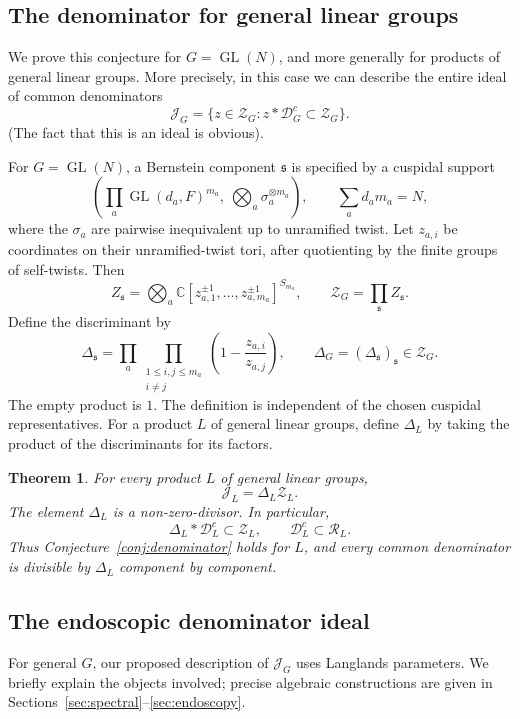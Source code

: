 \documentclass[11pt,a4paper]{amsart}
\newcommand{\mcD}{\mathcal D}
\newcommand{\mcZ}{\mathcal Z}
\newcommand{\mcR}{\mathcal R}
\newcommand{\mcJ}{\mathcal J}
\newtheorem{theorem}{Theorem}[section]
\theoremstyle{definition}
\theoremstyle{remark}
\DeclareMathOperator{\GL}{GL}
\newcommand{\grs}{\mathfrak s}
\begin{document}
\subsection{The denominator for general linear groups}
We prove this conjecture for $G=\GL(N)$, and more generally for
products of general linear groups. More precisely, in this case we
can describe the entire ideal of common denominators
$$
 \mcJ_G=\{z\in\mcZ_G:z*\mcD_G^c\subset\mcZ_G\}.
$$
(The fact that this is an ideal is obvious). 

For $G=\GL(N)$, a Bernstein component $\grs$ is specified by a
cuspidal support
$$
 \left(\prod_a\GL(d_a,F)^{m_a},\ 
             \bigotimes_a\sigma_a^{\otimes m_a}\right),
 \qquad \sum_a d_am_a=N,
$$
where the $\sigma_a$ are pairwise inequivalent up to unramified twist.
Let $z_{a,i}$ be coordinates on their unramified-twist tori, after
quotienting by the finite groups of self-twists. Then
$$
 Z_{\grs}=\bigotimes_a
    \mathbb C[z_{a,1}^{\pm1},\ldots,z_{a,m_a}^{\pm1}]^{S_{m_a}},
 \qquad \mcZ_G=\prod_{\grs}Z_{\grs}.
$$
Define the discriminant by
\begin{equation}\label{eq:intro-discriminant}
 \Delta_{\grs}
   =\prod_a\prod_{\substack{1\leq i,j\leq m_a\\i\ne j}}
            \left(1-\frac{z_{a,i}}{z_{a,j}}\right),
 \qquad \Delta_G=(\Delta_{\grs})_{\grs}\in\mcZ_G.
\end{equation}
The empty product is $1$. The definition is independent of the chosen
cuspidal representatives. For a product $L$ of general linear
groups, define $\Delta_L$ by taking the product of the discriminants
for its factors.

\begin{theorem}\label{T:denominator-exact}
For every product $L$ of general linear groups,
$$
 {\mcJ_L=\Delta_L\mcZ_L.}
$$
The element $\Delta_L$ is a non-zero-divisor. In particular,
$$
 \Delta_L*\mcD_L^c\subset\mcZ_L,
 \qquad \mcD_L^c\subset\mcR_L.
$$
Thus Conjecture~\ref{conj:denominator} holds for $L$, and every
common denominator is divisible by $\Delta_L$ component by component.
\end{theorem}

\subsection{The endoscopic denominator ideal}
For general $G$, our proposed description of $\mcJ_G$ uses
Langlands parameters. We briefly explain the objects involved; precise
algebraic constructions are given in Sections~\ref{sec:spectral}--\ref{sec:endoscopy}.
\end{document}
